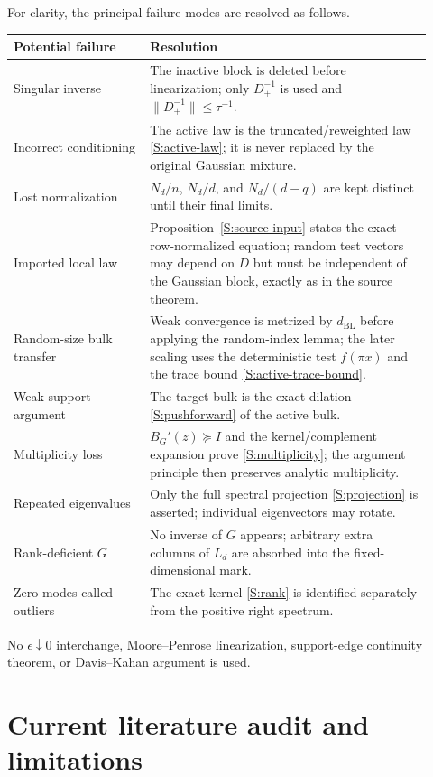 For clarity, the principal failure modes are resolved as follows.
\begin{center}
\begin{tabular}{@{}p{0.30\linewidth}p{0.62\linewidth}@{}}
\toprule
Potential failure & Resolution \\
\midrule
Singular inverse & The inactive block is deleted before linearization; only $D_+^{-1}$ is used and $\|D_+^{-1}\|\le\tau^{-1}$. \\
Incorrect conditioning & The active law is the truncated/reweighted law \eqref{S:active-law}; it is never replaced by the original Gaussian mixture. \\
Lost normalization & $N_d/n$, $N_d/d$, and $N_d/(d-q)$ are kept distinct until their final limits. \\
Imported local law & Proposition~\ref{S:source-input} states the exact row-normalized equation; random test vectors may depend on $D$ but must be independent of the Gaussian block, exactly as in the source theorem. \\
Random-size bulk transfer & Weak convergence is metrized by $d_{\mathrm{BL}}$ before applying the random-index lemma; the later scaling uses the deterministic test $f(\pi x)$ and the trace bound \eqref{S:active-trace-bound}. \\
Weak support argument & The target bulk is the exact dilation \eqref{S:pushforward} of the active bulk. \\
Multiplicity loss & $B_G'(z)\succeq I$ and the kernel/complement expansion prove \eqref{S:multiplicity}; the argument principle then preserves analytic multiplicity. \\
Repeated eigenvalues & Only the full spectral projection \eqref{S:projection} is asserted; individual eigenvectors may rotate. \\
Rank-deficient $G$ & No inverse of $G$ appears; arbitrary extra columns of $L_d$ are absorbed into the fixed-dimensional mark. \\
Zero modes called outliers & The exact kernel \eqref{S:rank} is identified separately from the positive right spectrum. \\
\bottomrule
\end{tabular}
\end{center}
No $\epsilon\downarrow0$ interchange, Moore--Penrose linearization, support-edge
continuity theorem, or Davis--Kahan argument is used.

\section{Current literature audit and limitations}
\label{S:literature-audit}

